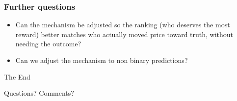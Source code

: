 \documentclass[
	11pt, %
]{beamer}
\begin{document}
\begin{frame}
	\frametitle{Further questions}
	\begin{itemize}
		\item Can the mechanism be adjusted so the ranking (who deserves the most reward) better matches who actually moved price toward truth, without needing the outcome?
		\item Can we adjust the mechanism to non binary predictions?
		\end{itemize}
\end{frame}



\begin{frame}[plain] %
	\begin{center}
		{\Huge The End}
		
		\bigskip\bigskip %
		
		{\LARGE Questions? Comments?}
	\end{center}
\end{frame}

\end{document}
